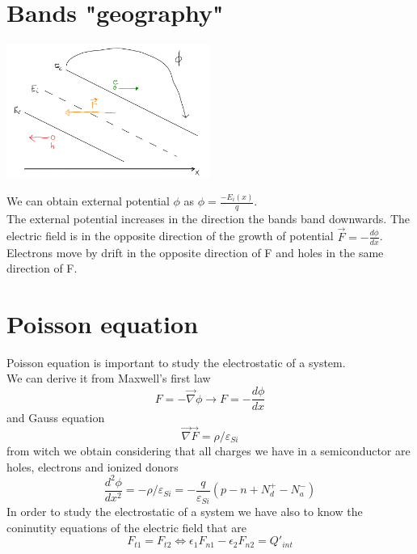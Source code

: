\section{Bands "geography"}

\centering
\includegraphics[width=0.5\textwidth]{bandsgeo.png}\\
\raggedright

We can obtain external potential $\phi$ as $\phi=\frac{-E_i(x)}{q}$.\\
The external potential increases in the direction the bands band downwards. The electric field is in the opposite direction of the growth of potential $\vec{F}=-\frac{d\phi}{dx}$.\\
Electrons move by drift in the opposite direction of F and holes in the same direction of F.\\

\section{Poisson equation}
Poisson equation is important to study the electrostatic of a system.\\
We can derive it from Maxwell's first law 
\begin{equation}
F=-\overrightarrow{\nabla}\phi\rightarrow F=-\frac{d\phi}{dx}
\end{equation}
and Gauss equation
\begin{equation}
\overrightarrow{\nabla}\overrightarrow{F}=\rho/\varepsilon_{Si}
\end{equation}
from witch we obtain considering that all charges we have in a semiconductor are holes, electrons and ionized donors 
\begin{equation}
\frac{d^2\phi}{dx^2}=-\rho/\varepsilon_{Si}=-\frac{q}{\varepsilon_{Si}}(p-n+N_d^+-N_a^-)
\end{equation}
In order to study the electrostatic of a system we have also to know the coninutity equations of the electric field that are
\begin{equation}
F_{t1}=F_{t2} \Longleftrightarrow \epsilon_1F_{n1}-\epsilon_2F_{n2}=Q'_{int}
\end{equation}
\newline
